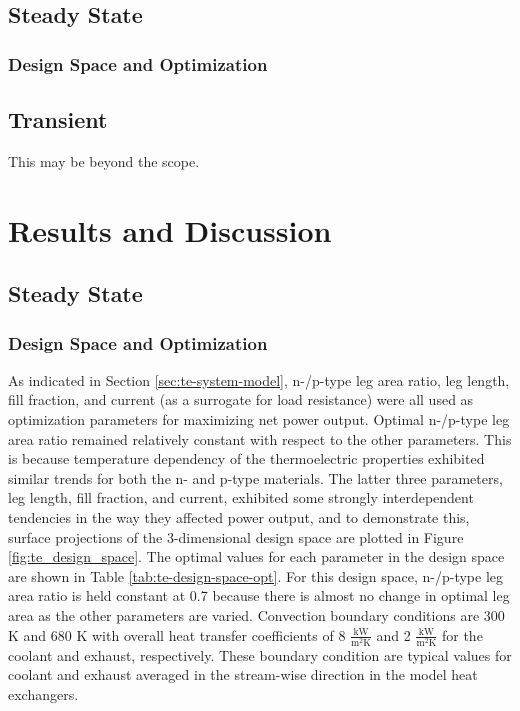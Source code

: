 \documentclass[preprint,authoryear,12pt]{elsarticle}
\begin{document}
\subsection{Steady State}
\label{sec:mod-steady-state}

\subsubsection{Design Space and Optimization}
\label{sec:mod-design-space}

\subsection{Transient}
\label{sec:mod-transient}

This may be beyond the scope.  

\section{Results and Discussion}
\label{sec:RandD}


\subsection{Steady State}
\label{sec:r-d-steady-state}


\subsubsection{Design Space and Optimization}
\label{sec:r-d-design-space}


As indicated in Section \ref{sec:te-system-model}, n-/p-type leg area
ratio, leg length, fill fraction, and current (as a surrogate for load
resistance) were all used as optimization parameters for maximizing
net power output.  Optimal n-/p-type leg area ratio remained
relatively constant with respect to the other parameters.  This is
because temperature dependency of the thermoelectric properties
exhibited similar trends for both the n- and p-type materials.  The
latter three parameters, leg length, fill fraction, and current,
exhibited some strongly interdependent tendencies in the way they
affected power output, and to demonstrate this, surface projections of
the 3-dimensional design space are plotted in Figure
\ref{fig:te_design_space}. The optimal values for each parameter in
the design space are shown in Table \ref{tab:te-design-space-opt}.
For this design space, n-/p-type leg area ratio is held constant at
0.7 because there is almost no change in optimal leg area as the other
parameters are varied.  Convection boundary conditions are 300 K and
680 K with overall heat transfer coefficients of 8
$\frac{\text{kW}}{\text{m}^2\text{K}}$ and 2
$\frac{\text{kW}}{\text{m}^2\text{K}}$ for the coolant and exhaust,
respectively.  These boundary condition are typical values for coolant
and exhaust averaged in the stream-wise direction in the model heat
exchangers.
\end{document}

